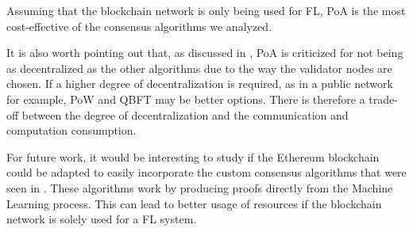 Assuming that the blockchain network is only being used for FL, PoA is the most cost-effective of the consensus algorithms we analyzed.

It is also worth pointing out that, as discussed in , PoA is criticized for not being as decentralized as the other algorithms due to the way the validator nodes are chosen. If a higher degree of decentralization is required, as in a public network for example, PoW and QBFT may be better options. There is therefore a trade-off between the degree of decentralization and the communication and computation consumption.

For future work, it would be interesting to study if the Ethereum blockchain could be adapted to easily incorporate the custom consensus algorithms that were seen in . These algorithms work by producing proofs directly from the Machine Learning process. This can lead to better usage of resources if the blockchain network is solely used for a FL system.